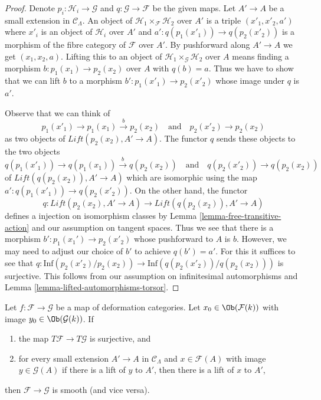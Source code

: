 \begin{proof}
Denote $p_i : \mathcal{H}_i \to \mathcal{G}$ and
$q : \mathcal{G} \to \mathcal{F}$ be the given maps.
Let $A' \to A$ be a small extension in $\mathcal{C}_\Lambda$.
An object of $\mathcal{H}_1 \times_\mathcal{F} \mathcal{H}_2$
over $A'$ is a triple $(x'_1, x'_2, a')$ where
$x'_i$ is an object of $\mathcal{H}_i$ over $A'$ and
$a' : q(p_1(x'_1)) \to q(p_2(x'_2))$ is a morphism
of the fibre category of $\mathcal{F}$ over $A'$.
By pushforward along $A' \to A$ we get
$(x_1, x_2, a)$. Lifting this to an object of
$\mathcal{H}_1 \times_\mathcal{G} \mathcal{H}_2$
over $A$ means finding a morphism
$b : p_1(x_1) \to p_2(x_2)$ over $A$ with $q(b) = a$.
Thus we have to show that we can lift $b$ to a morphism
$b' : p_1(x'_1) \to p_2(x'_2)$ whose image under $q$ is $a'$.

\medskip\noindent
Observe that we can think of
$$
p_1(x'_1) \to p_1(x_1) \xrightarrow{b} p_2(x_2)
\quad\text{and}\quad
p_2(x'_2) \to p_2(x_2)
$$
as two objects of $\textit{Lift}(p_2(x_2), A' \to A)$.
The functor $q$ sends these objects to the two objects
$$
q(p_1(x'_1)) \to q(p_1(x_1)) \xrightarrow{b} q(p_2(x_2))
\quad\text{and}\quad
q(p_2(x'_2)) \to q(p_2(x_2))
$$
of $\textit{Lift}(q(p_2(x_2)), A' \to A)$
which are isomorphic using the map $a' : q(p_1(x'_1)) \to q(p_2(x'_2))$.
On the other hand, the functor
$$
q : \textit{Lift}(p_2(x_2), A' \to A) \to
\textit{Lift}(q(p_2(x_2)), A' \to A)
$$
defines a injection on isomorphism classes by
Lemma \ref{lemma-free-transitive-action}
and our assumption on tangent spaces. Thus we see that there is a morphism
$b' : p_1(x_1') \to p_2(x'_2)$ whose pushforward to $A$ is $b$.
However, we may need to adjust our choice of $b'$
to achieve $q(b') = a'$. For this it suffices to see that
$q : \text{Inf}(p_2(x'_2)/p_2(x_2)) \to \text{Inf}(q(p_2(x'_2))/q(p_2(x_2)))$
is surjective. This follows from our assumption on
infinitesimal automorphisms and Lemma \ref{lemma-lifted-automorphisms-torsor}.
\end{proof}

\begin{lemma}
\label{lemma-easy-check-smooth}
Let $f : \mathcal{F} \to \mathcal{G}$ be a map of deformation
categories. Let $x_0 \in \Ob(\mathcal{F}(k))$ with image
$y_0 \in \Ob(\mathcal{G}(k))$. If
\begin{enumerate}
\item the map $T\mathcal{F} \to T\mathcal{G}$ is surjective, and
\item for every small extension $A' \to A$ in $\mathcal{C}_\Lambda$
and $x \in \mathcal{F}(A)$ with image $y \in \mathcal{G}(A)$
if there is a lift of $y$ to $A'$, then there is a lift
of $x$ to $A'$,
\end{enumerate}
then $\mathcal{F} \to \mathcal{G}$ is smooth (and vice versa).
\end{lemma}

